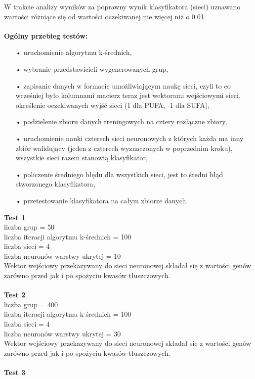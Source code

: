 \documentclass{classrep}
\begin{document}
W trakcie analizy wyników za poprawny wynik klasyfikatora (sieci) uznawano wartości różniące się od wartości oczekiwanej nie więcej niż o 0.01.\\\\
\textbf{Ogólny przebieg testów:}
\begin{itemize}
\item[•] uruchomienie algorytmu k-średnich,
\item[•] wybranie przedstawicieli wygenerowanych grup,
\item[•] zapisanie danych w formacie umożliwiającym naukę sieci, czyli to co wcześniej było kolumnami macierz teraz jest wektorami wejściowymi sieci, określenie oczekiwanych wyjść sieci (1 dla PUFA, -1 dla SUFA),
\item[•] podzielenie zbioru danych treningowych na cztery rozłączne zbiory,
\item[•] uruchomienie nauki czterech sieci neuronowych z których każda ma inny zbiór walidujący (jeden z czterech wyznaczonych w poprzednim kroku), wszystkie sieci razem stanowią klasyfikator,
\item[•] policzenie średniego błędu dla wszystkich sieci, jest to średni błąd stworzonego klasyfikatora,
\item[•] przetestowanie klasyfikatora na całym zbiorze danych.\\
\end{itemize}
\textbf{Test 1}\\
liczba grup = 50\\
liczba iteracji algorytmu k-średnich = 100\\
liczba sieci = 4\\
liczba neuronów warstwy ukrytej = 10\\
Wektor wejściowy przekazywany do sieci neuronowej składał się z wartości genów zarówno przed jak i po spożyciu kwasów tłuszczowych.\\\\
\textbf{Test 2}\\
liczba grup = 400\\
liczba iteracji algorytmu k-średnich = 100\\
liczba sieci = 4\\
liczba neuronów warstwy ukrytej = 30\\
Wektor wejściowy przekazywany do sieci neuronowej składał się z wartości genów zarówno przed jak i po spożyciu kwasów tłuszczowych.\\\\
\textbf{Test 3}\\
\end{document}
